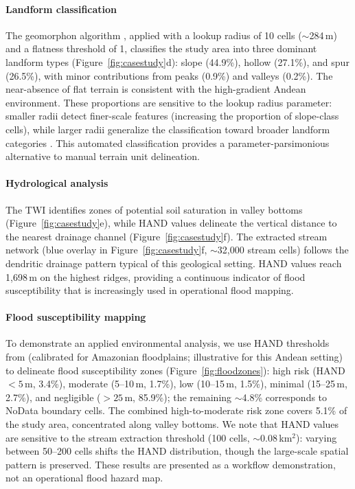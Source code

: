 \documentclass[preprint,review,12pt,authoryear]{elsarticle}
\begin{document}
\paragraph{Landform classification} The geomorphon algorithm \citep{jasiewicz2013}, applied with a lookup radius of 10 cells ($\sim$284\,m) and a flatness threshold of 1\textdegree, classifies the study area into three dominant landform types (Figure~\ref{fig:casestudy}d): slope (44.9\%), hollow (27.1\%), and spur (26.5\%), with minor contributions from peaks (0.9\%) and valleys (0.2\%). The near-absence of flat terrain is consistent with the high-gradient Andean environment. These proportions are sensitive to the lookup radius parameter: smaller radii detect finer-scale features (increasing the proportion of slope-class cells), while larger radii generalize the classification toward broader landform categories \citep{jasiewicz2013}. This automated classification provides a parameter-parsimonious alternative to manual terrain unit delineation.

\paragraph{Hydrological analysis} The TWI \citep{kopecky2021} identifies zones of potential soil saturation in valley bottoms (Figure~\ref{fig:casestudy}e), while HAND values \citep{nobre2011} delineate the vertical distance to the nearest drainage channel (Figure~\ref{fig:casestudy}f). The extracted stream network (blue overlay in Figure~\ref{fig:casestudy}f, $\sim$32{,}000 stream cells) follows the dendritic drainage pattern typical of this geological setting. HAND values reach 1{,}698\,m on the highest ridges, providing a continuous indicator of flood susceptibility that is increasingly used in operational flood mapping.

\paragraph{Flood susceptibility mapping} To demonstrate an applied environmental analysis, we use HAND thresholds from \citet{nobre2011} (calibrated for Amazonian floodplains; illustrative for this Andean setting) to delineate flood susceptibility zones (Figure~\ref{fig:floodzones}): high risk (HAND $< 5$\,m, 3.4\%), moderate (5--10\,m, 1.7\%), low (10--15\,m, 1.5\%), minimal (15--25\,m, 2.7\%), and negligible ($> 25$\,m, 85.9\%); the remaining $\sim$4.8\% corresponds to NoData boundary cells. The combined high-to-moderate risk zone covers 5.1\% of the study area, concentrated along valley bottoms. We note that HAND values are sensitive to the stream extraction threshold (100 cells, $\sim$0.08\,km$^2$): varying between 50--200 cells shifts the HAND distribution, though the large-scale spatial pattern is preserved. These results are presented as a workflow demonstration, not an operational flood hazard map.
\end{document}
